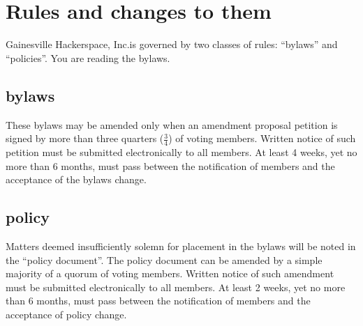 \documentclass[10pt,letterpaper,titlepage]{article}
\newcommand\corpname{Gainesville Hackerspace, Inc.}
\begin{document}
\section{Rules and changes to them}
\label{rules}
 
\corpname is governed by two classes of rules: ``bylaws'' and
``policies''.  You are reading the bylaws.

\subsection{bylaws}

These bylaws may be amended only when an amendment proposal petition
is signed by more than three quarters ($\frac{3}{4}$) of voting
members.  Written notice of such petition must be submitted
electronically to all members.  At least 4 weeks, yet no more than 6
months, must pass between the notification of members and the
acceptance of the bylaws change.

\subsection{policy}

Matters deemed insufficiently solemn for placement in the bylaws will
be noted in the ``policy document''.  The policy document can be
amended by a simple majority of a quorum of voting members.  Written
notice of such amendment must be submitted electronically to all
members.  At least 2 weeks, yet no more than 6 months, must pass
between the notification of members and the acceptance of policy
change.
\end{document}
